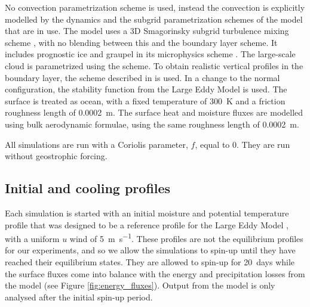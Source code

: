 \documentclass[11pt,a4paper]{article}
\begin{document}
No convection parametrization scheme is used, instead the convection is explicitly modelled by the dynamics and the subgrid parametrization schemes of the model that are in use. The model uses a 3D Smagorinsky subgrid turbulence mixing scheme \parencite{smagorinsky1964some}, with no blending between this and the boundary layer scheme. It includes prognostic ice and graupel in its microphysics scheme \parencite{wilson1999microphysically}. The large-scale cloud is parametrized using the \cite{smith1990scheme} scheme. To obtain realistic vertical profiles in the boundary layer, the scheme described in \cite{lock2000new} is used. In a change to the normal configuration, the stability function from the Large Eddy Model \parencite{petch2001sensitivity} is used.
The surface is treated as ocean, with a fixed temperature of \SI{300}{K} and a friction roughness length of \SI{0.0002}{m}. The surface heat and moisture fluxes are modelled using bulk aerodynamic formulae, using the same roughness length of \SI{0.0002}{m}.

All simulations are run with a Coriolis parameter, $f$, equal to 0. They are run without geostrophic forcing.

\subsection{Initial and cooling profiles}

Each simulation is started with an initial moisture and potential temperature profile that was designed to be a reference profile for the Large Eddy Model \parencite{petch2001sensitivity}, with a uniform $u$ wind of \SI{5}{m.s^{-1}}. These profiles are not the equilibrium profiles for our experiments, and so we allow the simulations to spin-up until they have reached their equilibrium states. They are allowed to spin-up for \SI{20}{days} while the surface fluxes come into balance with the energy and precipitation losses from the model (see Figure \ref{fig:energy_fluxes}). Output from the model is only analysed after the initial spin-up period.
\end{document}
